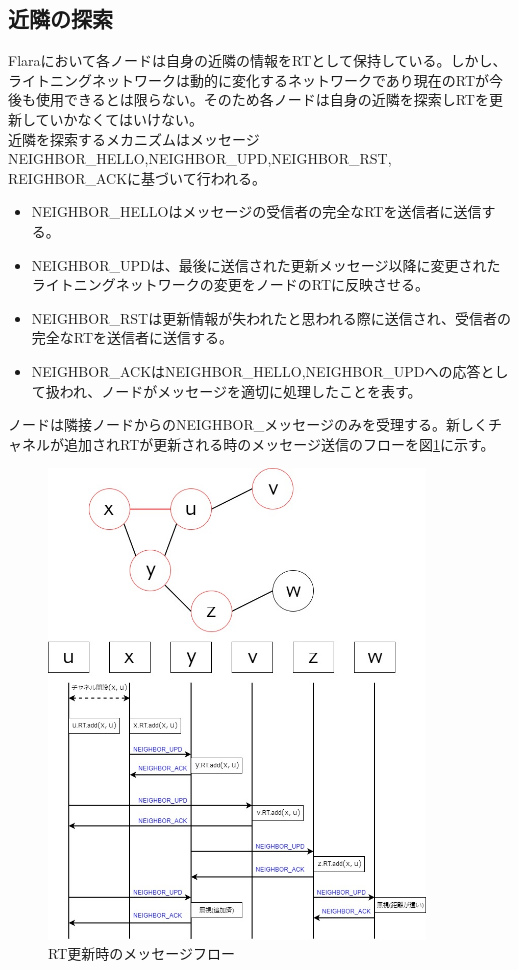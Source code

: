 \documentclass[12pt]{jarticle}
\begin{document}
\subsection{近隣の探索}
Flaraにおいて各ノードは自身の近隣の情報をRTとして保持している。しかし、ライトニングネットワークは動的に変化するネットワークであり現在のRTが今後も使用できるとは限らない。そのため各ノードは自身の近隣を探索しRTを更新していかなくてはいけない。\\
近隣を探索するメカニズムはメッセージNEIGHBOR\_HELLO,NEIGHBOR\_UPD,NEIGHBOR\_RST,\\REIGHBOR\_ACKに基づいて行われる。
\begin{itemize}
\item NEIGHBOR\_HELLOはメッセージの受信者の完全なRTを送信者に送信する。
\item NEIGHBOR\_UPDは、最後に送信された更新メッセージ以降に変更されたライトニングネットワークの変更をノードのRTに反映させる。
\item NEIGHBOR\_RSTは更新情報が失われたと思われる際に送信され、受信者の完全なRTを送信者に送信する。
\item NEIGHBOR\_ACKはNEIGHBOR\_HELLO,NEIGHBOR\_UPDへの応答として扱われ、ノードがメッセージを適切に処理したことを表す。
\end{itemize}

ノードは隣接ノードからのNEIGHBOR\_メッセージのみを受理する。新しくチャネルが追加されRTが更新される時のメッセージ送信のフローを図\ref{NBmes}に示す。

\begin{figure}[h]
 \centering
   \includegraphics[width=100mm]{figures/NBmes.jpg}
 \caption{RT更新時のメッセージフロー}
 \label{NBmes}
\end{figure}
\end{document}
